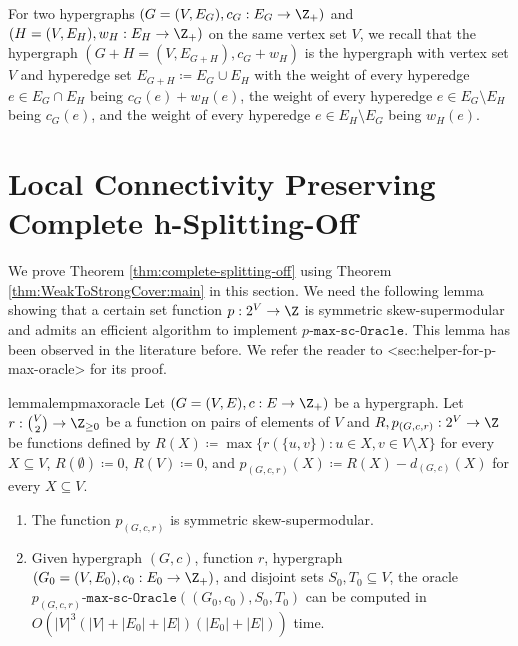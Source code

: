 \documentclass{article}
\def\Cref#1{<#1>}%
\newcommand{\functionMaximizationOracleStrongCover}[1]{\ensuremath{{#1}\text{-}\mathtt{max}\text{-}\mathtt{sc}\text{-}\mathtt{Oracle}}\xspace}
\begin{document}
For two hypergraphs $(G=(V, E_G), c_G:E_G\rightarrow \Z_+)$ and $(H=(V, E_H), w_H: E_H\rightarrow \Z_+)$ on the same vertex set $V$, we recall that the hypergraph $(G+H=(V, E_{G+H}), c_G+w_H)$ is the hypergraph with vertex set $V$ and hyperedge set $E_{G+H}\coloneqq E_G\cup E_H$ with the weight of every hyperedge $e\in E_G\cap E_H$ being $c_G(e) + w_H(e)$, the weight of every hyperedge $e\in E_G\setminus E_H$ being $c_G(e)$,  and the weight of every hyperedge $e\in E_H\setminus E_G$ being $w_H(e)$. 
\section{Local Connectivity Preserving Complete h-Splitting-Off}
\label{sec:hypergraph-splitting-off-proof}
We prove Theorem \ref{thm:complete-splitting-off} using Theorem \ref{thm:WeakToStrongCover:main} in this section. 
We need the following lemma showing that a certain set function $p: 2^V\rightarrow \Z$ is symmetric skew-supermodular and admits an efficient algorithm to implement \functionMaximizationOracleStrongCover{p}. This lemma has been observed in the literature before. We refer the reader to \Cref{sec:helper-for-p-max-oracle} for its proof. 

\begin{restatable}{lemma}{lempmaxoracle}\label{lemma:helper-for-p-max-oracle}
    Let $(G=(V, E), c: E\rightarrow \Z_+)$ be a hypergraph. Let $r:\binom{V}{2}\rightarrow \Z_{\ge 0}$ be a function on pairs of elements of $V$ and $R, p_{(G, c, r)}:2^V\rightarrow \Z$ be functions defined by $R(X)\coloneqq \max\{r(\{u, v\}): u\in X, v\in V\setminus X\}$ for every $X\subseteq V$, $R(\emptyset)\coloneqq 0$, $R(V)\coloneqq 0$, and $p_{(G, c, r)}(X)\coloneqq R(X)-d_{(G, c)}(X)$ for every $X\subseteq V$. 
    \begin{enumerate}
        \item The function $p_{(G, c, r)}$ is symmetric skew-supermodular. 
        \item 
        Given hypergraph $(G, c)$, function $r$, hypergraph $(G_0=(V, E_0), c_0: E_0\rightarrow \Z_{+})$, and disjoint sets $S_0, T_0\subseteq V$, the oracle   \functionMaximizationOracleStrongCover{p_{(G, c, r)}}$((G_0, c_0), S_0, T_0)$ can be computed in $O(|V|^3(|V|+|E_0|+|E|)(|E_0|+|E|))$ time.

    \end{enumerate}
\end{restatable}
\end{document}

